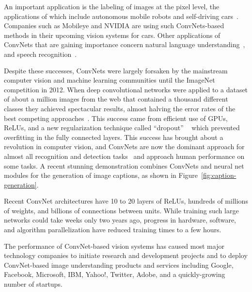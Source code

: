 \documentclass[10pts]{article}
\begin{document}
An important application is the labeling of images at the pixel level,
the applications of which include autonomous mobile robots and
self-driving cars~\cite{hadsell-jfr-09,farabet-icml-12}. Companies
such as Mobileye and NVIDIA are using such ConvNets-based methods in
their upcoming vision systems for cars.  Other applications of
ConvNets that are gaining importance concern natural language
understanding~\citep{collobert:2011b}, and speech
recognition~\cite{Sainath-et-al-ICASSP2013}.

Despite these successes, ConvNets were largely forsaken by the
mainstream computer vision and machine learning communities until the
ImageNet competition in 2012.  When deep convolutional networks were
applied to a dataset of about a million images from the web that
contained a thousand different classes they achieved spectacular
results, almost halving the error rates of the best competing
approaches~\citep{Krizhevsky-2012-small}.  This success came from
efficient use of GPUs, ReLUs, and a new regularization technique
called ``dropout'' ~\citep{Srivastava14} which prevented overfitting
in the fully connected layers.  This success has brought about a
revolution in computer vision, and ConvNets are now the dominant
approach for almost all recognition and detection
tasks~\citep{sermanet-iclr-14,girshick-cvpr-2014,taigman-cvpr-2014,simonyan-arxiv-2014,szegedy-2014,tompson-cvpr-15}
and approach human performance on some tasks. A recent stunning
demonstration combines ConvNets and neural net modules for the
generation of image captions, as shown in
Figure~\ref{fig:caption-generation}.

Recent ConvNet architectures have 10 to 20 layers of ReLUs, hundreds
of millions of weights, and billions of connections between
units. While training such large networks could take weeks only two
years ago, progress in hardware, software, and algorithm
parallelization have reduced training times to a few hours.

The performance of ConvNet-based vision systems has caused most major
technology companies to initiate research and development projects and
to deploy ConvNet-based image understanding products and services
including Google, Facebook, Microsoft, IBM, Yahoo!, Twitter, Adobe,
and a quickly-growing number of startups.
\end{document}
